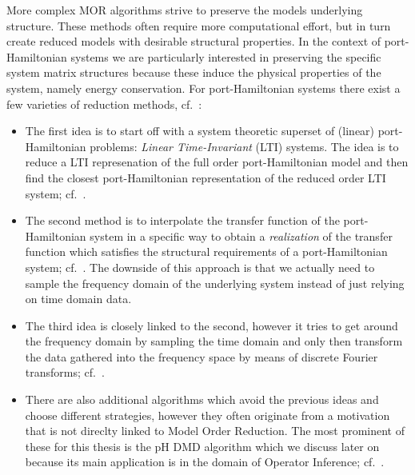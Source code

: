 More complex MOR algorithms strive to preserve the models underlying structure.
These methods often require more computational effort, but in turn create reduced models with desirable structural properties.
In the context of port-Hamiltonian systems we are particularly interested in preserving the specific system matrix structures because these induce the physical properties of the system, namely energy conservation.
For port-Hamiltonian systems there exist a few varieties of reduction methods, cf.~\cite{Polyuga2010}:
\begin{itemize}
    \item The first idea is to start off with a system theoretic superset of (linear) port-Hamiltonian problems: \emph{Linear Time-Invariant} (LTI) systems.
        The idea is to reduce a LTI represenation of the full order port-Hamiltonian model and then find the closest port-Hamiltonian representation of the reduced order LTI system; cf.~\cite{Gillis2018, Cherifi2019}.
    \item The second method is to interpolate the transfer function of the port-Hamiltonian system in a specific way to obtain a \emph{realization} of the transfer function which satisfies the structural requirements of a port-Hamiltonian system; cf.~\cite{BGD2020, Schwerdtner2021, Poussot2022}.
        The downside of this approach is that we actually need to sample the frequency domain of the underlying system instead of just relying on time domain data.
    \item The third idea is closely linked to the second, however it tries to get around the frequency domain by sampling the time domain and only then transform the data gathered into the frequency space by means of discrete Fourier transforms; cf.~\cite{Najnudel2021, Cherifi2022, Günther2023}.
    \item There are also additional algorithms which avoid the previous ideas and choose different strategies, however they often originate from a motivation that is not direclty linked to Model Order Reduction.
        The most prominent of these for this thesis is the pH DMD algorithm which we discuss later on because its main application is in the domain of Operator Inference; cf.~\cite{Morandin2022}.
\end{itemize}

